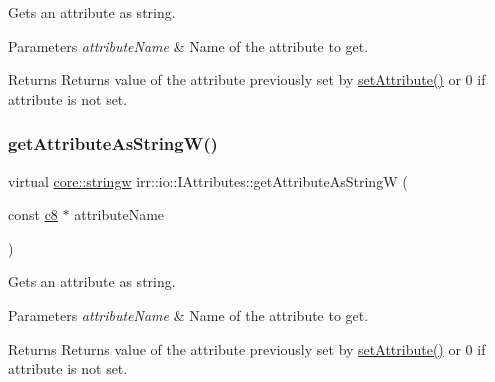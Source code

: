 Gets an attribute as string. 


\begin{DoxyParams}{Parameters}
{\em attribute\+Name} & Name of the attribute to get. \\
\hline
\end{DoxyParams}
\begin{DoxyReturn}{Returns}
Returns value of the attribute previously set by \hyperlink{classirr_1_1io_1_1IAttributes_a03fa31acb481ae23678676cc183f09a6}{set\+Attribute()} or 0 if attribute is not set. 
\end{DoxyReturn}
\mbox{\label{classirr_1_1io_1_1IAttributes_a874219751c3a52d781cdfa372cd8bcf5}} 
\subsubsection{\texorpdfstring{get\+Attribute\+As\+String\+W()}{getAttributeAsStringW()}\hspace{0.1cm}{\footnotesize\ttfamily [2/6]}}
{\footnotesize\ttfamily virtual \hyperlink{namespaceirr_1_1core_a5aedb62cb47cf01d1c548ab5e6344d2d}{core\+::stringw} irr\+::io\+::\+I\+Attributes\+::get\+Attribute\+As\+StringW (\begin{DoxyParamCaption}\item[{const \hyperlink{namespaceirr_a9395eaea339bcb546b319e9c96bf7410}{c8} $\ast$}]{attribute\+Name }\end{DoxyParamCaption})\hspace{0.3cm}{\ttfamily [pure virtual]}}



Gets an attribute as string. 


\begin{DoxyParams}{Parameters}
{\em attribute\+Name} & Name of the attribute to get. \\
\hline
\end{DoxyParams}
\begin{DoxyReturn}{Returns}
Returns value of the attribute previously set by \hyperlink{classirr_1_1io_1_1IAttributes_a03fa31acb481ae23678676cc183f09a6}{set\+Attribute()} or 0 if attribute is not set. 
\end{DoxyReturn}
\mbox{\label{classirr_1_1io_1_1IAttributes_a972aca66779e767e635a1c52b1559382}} 
